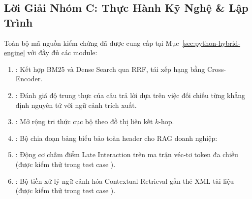 \subsection{Lời Giải Nhóm C: Thực Hành Kỹ Nghệ \& Lập Trình}
Toàn bộ mã nguồn kiểm chứng đã được cung cấp tại Mục~\ref{sec:python-hybrid-engine} với đầy đủ các module:
\begin{enumerate}
  \item {}: Kết hợp BM25 và Dense Search qua RRF, tái xếp hạng bằng Cross-Encoder.
  \item {}: Đánh giá độ trung thực của câu trả lời dựa trên việc đối chiếu từng khẳng định nguyên tử với ngữ cảnh trích xuất.
  \item {}: Mở rộng tri thức cục bộ theo đồ thị liên kết $k$-hop.
  \item {}: Bộ chia đoạn bảng biểu bảo toàn header cho RAG doanh nghiệp:
  \item {}: Động cơ chấm điểm Late Interaction trên ma trận véc-tơ token đa chiều (được kiểm thử trong test case ).
  \item {}: Bộ tiền xử lý ngữ cảnh hóa Contextual Retrieval gắn thẻ XML tài liệu (được kiểm thử trong test case ).
\end{enumerate}

